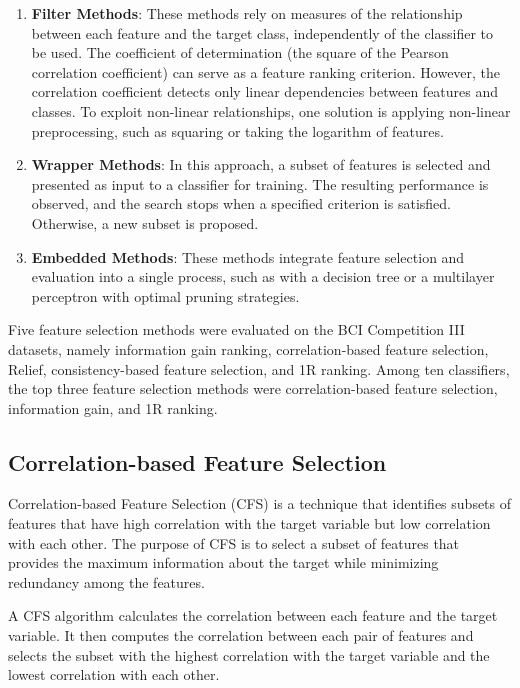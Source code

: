 \documentclass{article}
\begin{document}
\begin{enumerate}
    \item \textbf{Filter Methods}: These methods rely on measures of the relationship between each feature and the target class, independently of the classifier to be used. The coefficient of determination (the square of the Pearson correlation coefficient) can serve as a feature ranking criterion. However, the correlation coefficient detects only linear dependencies between features and classes. To exploit non-linear relationships, one solution is applying non-linear preprocessing, such as squaring or taking the logarithm of features.

    \item \textbf{Wrapper Methods}: In this approach, a subset of features is selected and presented as input to a classifier for training. The resulting performance is observed, and the search stops when a specified criterion is satisfied. Otherwise, a new subset is proposed.

    \item \textbf{Embedded Methods}: These methods integrate feature selection and evaluation into a single process, such as with a decision tree or a multilayer perceptron with optimal pruning strategies.
\end{enumerate}

Five feature selection methods were evaluated on the BCI Competition III datasets, namely information gain ranking, correlation-based feature selection, Relief, consistency-based feature selection, and 1R ranking. Among ten classifiers, the top three feature selection methods were correlation-based feature selection, information gain, and 1R ranking.

\subsection{Correlation-based Feature Selection}
Correlation-based Feature Selection (CFS) is a technique that identifies subsets of features that have high correlation with the target variable but low correlation with each other. The purpose of CFS is to select a subset of features that provides the maximum information about the target while minimizing redundancy among the features.

A CFS algorithm calculates the correlation between each feature and the target variable. It then computes the correlation between each pair of features and selects the subset with the highest correlation with the target variable and the lowest correlation with each other.
\end{document}

